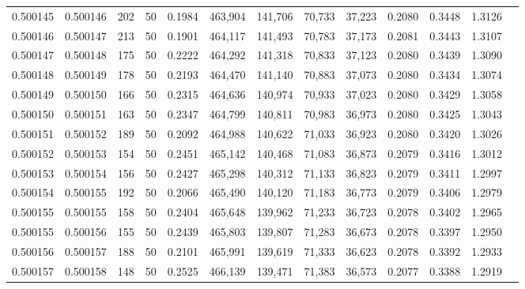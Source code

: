 \begin{tabular}{rrrrrrrrrrrrr}
0.500145 & 0.500146 & 202 &  50 &                                     0.1984 & 463,904 & 141,706 &  70,733 &  37,223 & 0.2080 & 0.3448 & 1.3126 \\
0.500146 & 0.500147 & 213 &  50 &                                     0.1901 & 464,117 & 141,493 &  70,783 &  37,173 & 0.2081 & 0.3443 & 1.3107 \\
0.500147 & 0.500148 & 175 &  50 &                                     0.2222 & 464,292 & 141,318 &  70,833 &  37,123 & 0.2080 & 0.3439 & 1.3090 \\
0.500148 & 0.500149 & 178 &  50 &                                     0.2193 & 464,470 & 141,140 &  70,883 &  37,073 & 0.2080 & 0.3434 & 1.3074 \\
0.500149 & 0.500150 & 166 &  50 &                                     0.2315 & 464,636 & 140,974 &  70,933 &  37,023 & 0.2080 & 0.3429 & 1.3058 \\
0.500150 & 0.500151 & 163 &  50 &                                     0.2347 & 464,799 & 140,811 &  70,983 &  36,973 & 0.2080 & 0.3425 & 1.3043 \\
0.500151 & 0.500152 & 189 &  50 &                                     0.2092 & 464,988 & 140,622 &  71,033 &  36,923 & 0.2080 & 0.3420 & 1.3026 \\
0.500152 & 0.500153 & 154 &  50 &                                     0.2451 & 465,142 & 140,468 &  71,083 &  36,873 & 0.2079 & 0.3416 & 1.3012 \\
0.500153 & 0.500154 & 156 &  50 &                                     0.2427 & 465,298 & 140,312 &  71,133 &  36,823 & 0.2079 & 0.3411 & 1.2997 \\
0.500154 & 0.500155 & 192 &  50 &                                     0.2066 & 465,490 & 140,120 &  71,183 &  36,773 & 0.2079 & 0.3406 & 1.2979 \\
0.500155 & 0.500155 & 158 &  50 &                                     0.2404 & 465,648 & 139,962 &  71,233 &  36,723 & 0.2078 & 0.3402 & 1.2965 \\
0.500155 & 0.500156 & 155 &  50 &                                     0.2439 & 465,803 & 139,807 &  71,283 &  36,673 & 0.2078 & 0.3397 & 1.2950 \\
0.500156 & 0.500157 & 188 &  50 &                                     0.2101 & 465,991 & 139,619 &  71,333 &  36,623 & 0.2078 & 0.3392 & 1.2933 \\
0.500157 & 0.500158 & 148 &  50 &                                     0.2525 & 466,139 & 139,471 &  71,383 &  36,573 & 0.2077 & 0.3388 & 1.2919 \\

\end{tabular}
